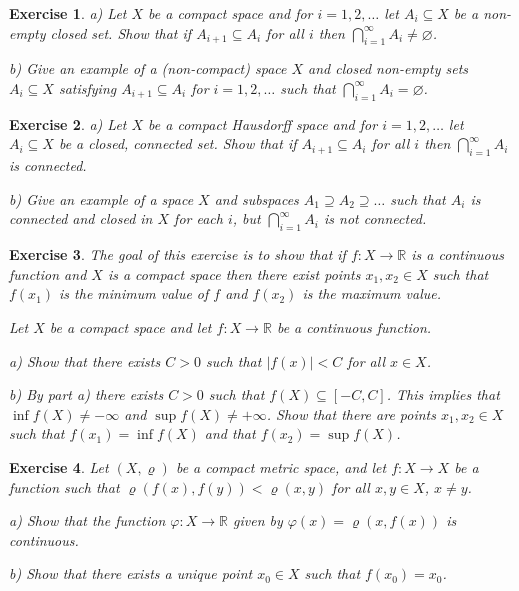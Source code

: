 \documentclass[11pt, letterpaper, oneside]{report}
\theoremstyle{pplain}
\newtheorem{ITERMVALUE THM}[theorem]{Intermediate Value Theorem}
\newtheorem{HEINEBOREL THM}[theorem]{Heine-Borel Theorem}
\newtheorem{UMETR THM}[theorem]{Urysohn Metrization Theorem}
\newtheorem{UMETR2 THM}[theorem]{Urysohn Metrization Theorem (v.2)}
\theoremstyle{ddefinition}
\theoremstyle{nnn}
\newtheorem{TDA NN}[theorem]{Topological Data Analysis. }
\theoremstyle{eexercise}
\newtheorem{exercise}{Exercise}[chapter]
\newcommand{\R}{{\mathbb R}}
\begin{document}
\begin{exercise}
a) Let $X$ be a compact  space and for $i=1, 2, \dots$ let $A_{i} \subseteq X$ be a 
non-empty closed set. Show that if $A_{i+1} \subseteq A_{i}$ for all $i$
then $\bigcap_{i=1}^{\infty}A_{i} \neq \varnothing$. 

b) Give an example of a (non-compact) space $X$ and  closed non-empty sets 
$A_{i}\subseteq X$ satisfying $A_{i+1}\subseteq A_{i}$ for $i=1, 2, \dots$ such that 
$\bigcap_{i=1}^{\infty} A_{i} = \varnothing$. 
\end{exercise}




\begin{exercise} a) Let $X$ be a compact  Hausdorff space and for $i=1, 2, \dots$ let $A_{i} \subseteq X$ be a 
closed, connected set. Show that if $A_{i+1} \subseteq A_{i}$ for all $i$
then $\bigcap_{i=1}^{\infty}A_{i}$ is connected. 

b) Give an example of a space $X$ and  subspaces $A_{1}\supseteq A_{2}\supseteq {\dots}$
such that $A_{i}$ is connected and closed in $X$ for each $i$, but $\bigcap_{i=1}^{\infty}A_{i}$ is not connected.
\end{exercise}






\begin{exercise}
\label{COMP MINMAX EXE}
The goal of this exercise is to show that if $f\colon X\to \R$ is a continuous function 
and $X$ is a compact space then there exist points $x_{1}, x_{2}\in X$ such that 
$f(x_{1})$ is the minimum value of $f$ and $f(x_{2})$ is the maximum value. 

Let $X$ be a compact space and let $f\colon X\to \R$ be a continuous function. 

a) Show that there exists $C > 0 $  such that $|f(x)| < C$ for all 
$x\in X$. 

b) By part a)  there exists $C> 0$ such that $f(X)\subseteq [-C, C]$. This implies  that $\inf f(X)\neq -\infty$
and $\sup f(X)\neq +\infty$. Show that there are points $x_{1}, x_{2}\in X$ such that 
$f(x_{1}) = \inf f(X)$ and  that $f(x_{2}) = \sup f(X)$. 
\end{exercise}




\begin{exercise}
\label{COMPACT METRIC FIXED POINT EXERCISE}
Let $(X, \varrho)$ be a compact metric space, and let $f\colon X\to X$ be a function 
such that $\varrho(f(x), f(y)) < \varrho(x, y)$ for all $x, y\in X$, $x\neq y$. 

a) Show that the function $\varphi\colon X \to \R$ given by $\varphi(x) = \varrho(x, f(x))$
is continuous. 

b) Show that there exists a unique point $x_{0}\in X$ such that $f(x_{0}) = x_{0}$. 
\end{exercise}
\end{document}

